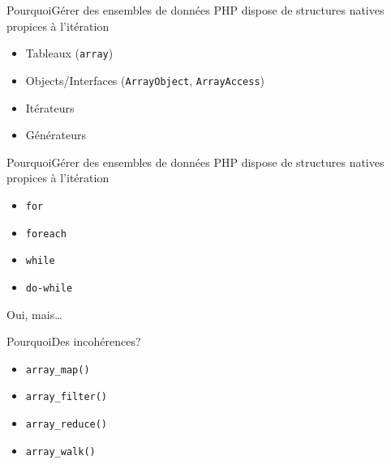 \begin{frame}{Pourquoi}{Gérer des ensembles de données}
    PHP dispose de structures natives propices à l'itération

    \begin{itemize}[<+->]
        \item Tableaux (\texttt{array})
        \item Objects/Interfaces (\texttt{ArrayObject}, \texttt{ArrayAccess})
        \item Itérateurs
        \item Générateurs
    \end{itemize}
\end{frame}

\begin{frame}{Pourquoi}{Gérer des ensembles de données}
    PHP dispose de structures natives propices à l'itération

    \begin{itemize}[<+->]
        \item \texttt{for}
        \item \texttt{foreach}
        \item \texttt{while}
        \item \texttt{do-while}
    \end{itemize}
\end{frame}

\begin{frameC}{Oui, mais\ldots}

\end{frameC}

\begin{frame}{Pourquoi}{Des incohérences?}
    \begin{itemize}[<+->]
        \item \texttt{array\_map()}
        \item \texttt{array\_filter()}
        \item \texttt{array\_reduce()}
        \item \texttt{array\_walk()}
    \end{itemize}
\end{frame}

